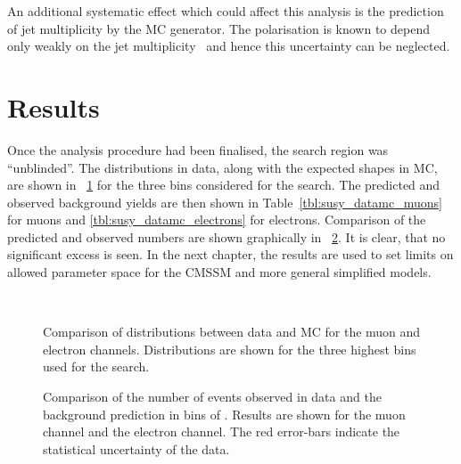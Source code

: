 An additional systematic effect which could affect this analysis is
the prediction of jet multiplicity by the \ac{MC} generator. The \PW
polarisation is known to depend only weakly on the jet
multiplicity~\cite{berger_left_handed_w} and hence this uncertainty
can be neglected.




\section{Results}
Once the analysis procedure had been finalised, the search region was
``unblinded''. The \LP distributions in data, along with the expected shapes in
\ac{MC}, are shown in \fig~\ref{fig:susy_datamc} for the three \STlep bins
considered for the search. The predicted and observed background yields are then
shown in Table~\ref{tbl:susy_datamc_muons} for muons and
\ref{tbl:susy_datamc_electrons} for electrons. Comparison of the predicted and
observed numbers are shown graphically in \fig~\ref{fig:susy_pred}. It is clear,
that no significant excess is seen. In the next chapter, the results are used to
set limits on allowed parameter space for the \ac{CMSSM} and more general
simplified models.

\begin{figure}
  \centering {}\quad
  \quad
  \\
  \quad
  \quad
  \caption[Comparison of \LP distributions between data and \acs{MC}]{Comparison
    of \LP distributions between data and \ac{MC} for the muon and electron
    channels. Distributions are shown for the three highest \STlep bins used for
    the search.}
\label{fig:susy_datamc}
\end{figure}




\begin{figure}
\centering
{}\quad
{}\quad
\caption[Comparison of predicted and observed event yields in bins of
\STlep]{Comparison of the number of events observed in data and the background
  prediction in bins of \STlep. Results are shown for 
  the muon channel and  the electron channel. The red
  error-bars indicate the statistical uncertainty of the data.}
\label{fig:susy_pred}
\end{figure}
